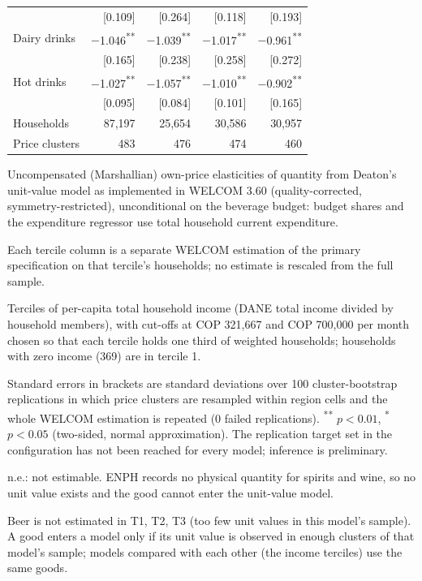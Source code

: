 \begin{table}[!htbp]
\begin{threeparttable}
\begin{tabular}{lrrrr}
 & [0.109] & [0.264] & [0.118] & [0.193] \\
Dairy drinks & $-$1.046\textsuperscript{**} & $-$1.039\textsuperscript{**} & $-$1.017\textsuperscript{**} & $-$0.961\textsuperscript{**} \\
 & [0.165] & [0.238] & [0.258] & [0.272] \\
Hot drinks & $-$1.027\textsuperscript{**} & $-$1.057\textsuperscript{**} & $-$1.010\textsuperscript{**} & $-$0.902\textsuperscript{**} \\
 & [0.095] & [0.084] & [0.101] & [0.165] \\
\addlinespace
Households & 87,197 & 25,654 & 30,586 & 30,957 \\
Price clusters & 483 & 476 & 474 & 460 \\
\bottomrule
\end{tabular}
\begin{tablenotes}[flushleft]
\footnotesize
\item Uncompensated (Marshallian) own-price elasticities of quantity from Deaton's unit-value model as implemented in WELCOM 3.60 (quality-corrected, symmetry-restricted), unconditional on the beverage budget: budget shares and the expenditure regressor use total household current expenditure.
\item Each tercile column is a separate WELCOM estimation of the primary specification on that tercile's households; no estimate is rescaled from the full sample.
\item Terciles of per-capita total household income (DANE total income divided by household members), with cut-offs at COP 321,667 and COP 700,000 per month chosen so that each tercile holds one third of weighted households; households with zero income (369) are in tercile 1.
\item Standard errors in brackets are standard deviations over 100 cluster-bootstrap replications in which price clusters are resampled within region cells and the whole WELCOM estimation is repeated (0 failed replications). \textsuperscript{**} $p<0.01$, \textsuperscript{*} $p<0.05$ (two-sided, normal approximation). The replication target set in the configuration has not been reached for every model; inference is preliminary.
\item n.e.: not estimable. ENPH records no physical quantity for spirits and wine, so no unit value exists and the good cannot enter the unit-value model.
\item Beer is not estimated in T1, T2, T3 (too few unit values in this model's sample). A good enters a model only if its unit value is observed in enough clusters of that model's sample; models compared with each other (the income terciles) use the same goods.
\end{tablenotes}
\end{threeparttable}
\end{table}
